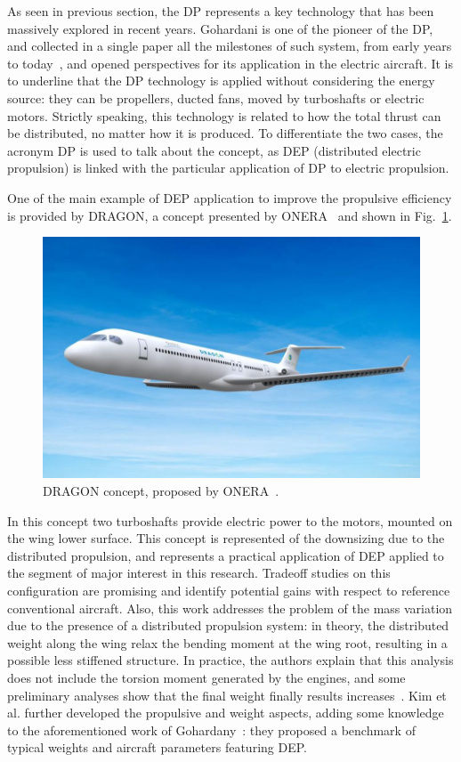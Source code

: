 As seen in previous section, the DP represents a key technology that has been massively explored in recent years.
Gohardani is one of the pioneer of the DP, and collected in a single paper all the milestones of such system, from early years to today~\cite{bib:gohardani}, and opened perspectives for its application in the electric aircraft. 
It is to underline that the DP technology is applied without considering the energy source: they can be propellers, ducted fans, moved by turboshafts or electric motors. 
Strictly speaking, this technology is related to how the total thrust can be distributed, no matter how it is produced.
To differentiate the two cases, the acronym DP is used to talk about the concept, as DEP (distributed electric propulsion) is linked with the particular application of DP to electric propulsion. 

One of the main example of DEP application to improve the propulsive efficiency is provided by DRAGON, a concept presented by ONERA~\cite{bib:dragon} and shown in Fig.~\ref{fig:dragon}. 
\begin{figure}[h!]
	\centering
	\includegraphics[keepaspectratio, width=0.5\linewidth]{images/chap1/dragon.jpg}
	\caption{DRAGON concept, proposed by ONERA~\cite{bib:dragon}.}
	\label{fig:dragon}
\end{figure}
In this concept two turboshafts provide electric power to the motors, mounted on the wing lower surface.
This concept is represented of the downsizing due to the distributed propulsion, and represents a practical application of DEP applied to the segment of major interest in this research. 
Tradeoff studies on this configuration are promising and identify potential gains with respect to reference conventional aircraft.
Also, this work addresses the problem of the mass variation due to the presence of a distributed propulsion system: in theory, the distributed weight along the wing relax the bending moment at the wing root, resulting in a possible less stiffened structure. 
In practice, the authors explain that this analysis does not include the torsion moment generated by the engines, and some preliminary analyses show that the final weight finally results increases~\cite{bib:dragon}. 
Kim et al. further developed the propulsive and weight aspects, adding some knowledge to the aforementioned work of Gohardany~\cite{bib:kim_dep, bib:kim_dep_review}: they proposed a benchmark of typical weights and aircraft parameters featuring DEP. 


